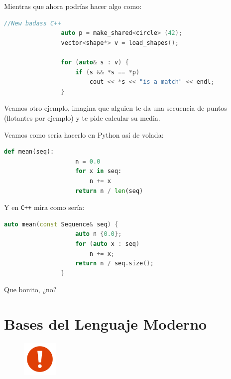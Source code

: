 \documentclass[12pt, fleqn]{report}                             %
\theoremstyle{break}                                            %
\newcommand{\textCode}[1]  { \texttt{#1} }                      %
\newcommand \Cpp  {\textCode{C++} }                               %
\begin{document}
            Mientras que ahora podrías hacer algo como:
            \begin{lstlisting}[language=C++, gobble=16]
                //New badass C++
                auto p = make_shared<circle> (42);
                vector<shape*> v = load_shapes();

                for (auto& s : v) {
                    if (s && *s == *p)
                        cout << *s << "is a match" << endl;
                }
            \end{lstlisting}

            \clearpage

            Veamos otro ejemplo, imagina que alguien te da una secuencia de 
            puntos (flotantes por ejemplo) y te pide calcular su media.

            Veamos como sería hacerlo en Python así de volada:
            \begin{lstlisting}[language=python, gobble=16]
                def mean(seq):
                    n = 0.0
                    for x in seq:
                        n += x
                    return n / len(seq)
            \end{lstlisting}

            Y en \Cpp mira como sería:
            \begin{lstlisting}[language=C++, gobble=16]
                auto mean(const Sequence& seq) {
                    auto n {0.0};
                    for (auto x : seq)
                        n += x;
                    return n / seq.size();
                }
            \end{lstlisting}

            Que bonito, ¿no?
            \cite{ModernCppWhatYouNeedToKnow}


    \clearpage
    \chapter{Bases del Lenguaje Moderno}

        \begin{figure}
            \centering
            \includegraphics[width=0.15\textwidth]{Warning}
        \end{figure}
\end{document}
